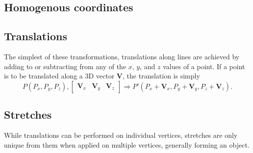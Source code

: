 \documentclass[12pt, a4paper]{article}
\begin{document}
    \subsection{Homogenous coordinates}
    

    \subsection{Translations}

    The simplest of these transformations, translations along
    lines are achieved by adding to or subtracting from any of
    the $x$, $y$, and $z$ values of a point. If a point is to be
    translated along a 3D vector $\mathbf{V}$, the translation
    is simply
    \begin{equation}
    P(P_x, P_y, P_z), \begin{bmatrix}
        \mathbf{V}_x & \mathbf{V}_y & \mathbf{V}_z 
        \end{bmatrix} \Rightarrow P'(P_x + \mathbf{V}_x, P_y + \mathbf{V}_y, P_z + 
        \mathbf{V}_z).
    \end{equation}

    \subsection{Stretches}

    While translations can be performed on individual vertices,
    stretches are only unique from them when applied on multiple
    vertices, generally forming an object. 
    
\end{document}
